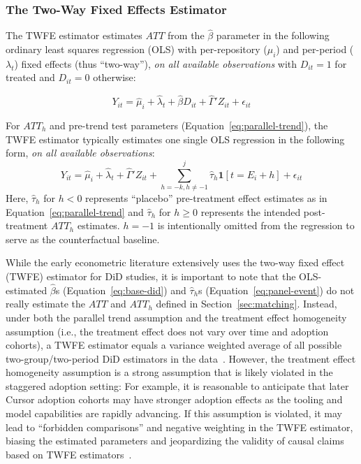 \subsubsection{The Two-Way Fixed Effects Estimator}
\label{sec:twfe}

The TWFE estimator estimates $ATT$ from the $\hat\beta$ parameter in the following ordinary least squares regression (OLS) with per-repository ($\mu_i$) and per-period ($\lambda_t$) fixed effects (thus ``two-way''), \emph{on all available observations} with $D_{it} = 1$ for treated and $D_{it}=0$ otherwise:

\begin{equation}
\label{eq:base-did}
    Y_{it} = \hat\mu_i + \hat\lambda_t + \hat\beta D_{it} + \hat\Gamma'Z_{it} + \epsilon_{it}
\end{equation}

For $ATT_h$ and pre-trend test parameters (Equation~\ref{eq:parallel-trend}), the TWFE estimator typically estimates one single OLS regression in the following form, \emph{on all available observations}:
\begin{equation}
\label{eq:panel-event}
    Y_{it}=\hat{\mu}_i + \hat{\lambda}_t + \hat{\Gamma}' Z_{it} + \sum_{h=-k, h\ne -1}^{j}\hat\tau_h\mathbf{1}[t=E_i + h] + \epsilon_{it}
\end{equation}
Here, $\hat\tau_h$ for $h<0$ represents ``placebo'' pre-treatment effect estimates as in Equation~\ref{eq:parallel-trend} and $\hat\tau_h$ for $h\ge0$ represents the intended post-treatment $ATT_h$ estimates.
$h=-1$ is intentionally omitted from the regression to serve as the counterfactual baseline.

While the early econometric literature extensively uses the two-way fixed effect (TWFE) estimator for DiD studies, it is important to note that the OLS-estimated $\hat\beta$s (Equation~\ref{eq:base-did}) and $\hat\tau_h$s (Equation~\ref{eq:panel-event}) do not really estimate the $ATT$ and $ATT_h$ defined in Section~\ref{sec:matching}.
Instead, under both the parallel trend assumption and the treatment effect homogeneity assumption (i.e., the treatment effect does not vary over time and adoption cohorts), a TWFE estimator equals a variance weighted average of all possible two-group/two-period DiD estimators in the data~\cite{goodman2021difference}.
However, the treatment effect homogeneity assumption is a strong assumption that is likely violated in the staggered adoption setting: For example, it is reasonable to anticipate that later Cursor adoption cohorts may have stronger adoption effects as the tooling and model capabilities are rapidly advancing.
If this assumption is violated, it may lead to ``forbidden comparisons'' and negative weighting in the TWFE estimator, biasing the estimated parameters and jeopardizing the validity of causal claims based on TWFE estimators~\cite{dechaisemartin2020two, athey2022design}.

